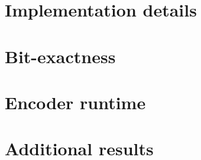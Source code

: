 \clearpage
\setcounter{page}{1}
\maketitlesupplementary

\section{Implementation details}
\label{sec:supp_impl}

\section{Bit-exactness}
\label{sec:supp_bitexact}

\section{Encoder runtime}
\label{sec:supp_runtime}

\section{Additional results}
\label{sec:supp_results}

